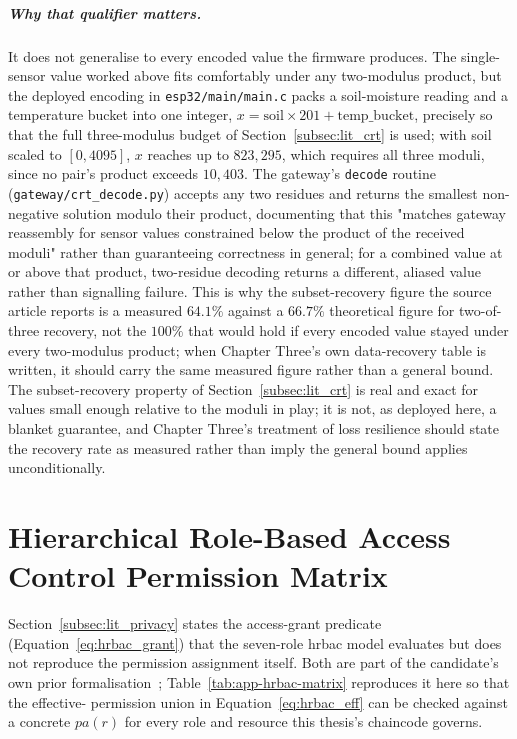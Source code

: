 \documentclass[12pt,a4paper,oneside]{book}
\begin{document}
\paragraph{Why that qualifier matters.} It does not generalise to every
encoded value the firmware produces. The single-sensor value worked above
fits comfortably under any two-modulus product, but the deployed encoding
in \texttt{esp32/main/main.c} packs a soil-moisture reading and a
temperature bucket into one integer, $x = \mathrm{soil}\times 201 +
\mathrm{temp\_bucket}$, precisely so that the full three-modulus budget of
Section~\ref{subsec:lit_crt} is used; with soil scaled to
$[0,4095]$, $x$ reaches up to $823{,}295$, which requires all three
moduli, since no pair's product exceeds $10{,}403$. The gateway's
\texttt{decode} routine (\texttt{gateway/crt\_decode.py}) accepts any two
residues and returns the smallest non-negative solution modulo their
product, documenting that this "matches gateway reassembly for sensor
values constrained below the product of the received moduli" rather than
guaranteeing correctness in general; for a combined value at or above
that product, two-residue decoding returns a different, aliased value
rather than signalling failure. This is why the subset-recovery figure
the source article reports is a measured $64.1\%$ against a $66.7\%$
theoretical figure for two-of-three recovery, not the $100\%$ that would
hold if every encoded value stayed under every two-modulus product; when
Chapter Three's own data-recovery table is written, it should carry the
same measured figure rather than a general bound. The
subset-recovery property of Section~\ref{subsec:lit_crt} is real and
exact for values small enough relative to the moduli in play; it is not,
as deployed here, a blanket guarantee, and Chapter Three's treatment of
loss resilience should state the recovery rate as measured rather than
imply the general bound applies unconditionally.

\chapter{Hierarchical Role-Based Access Control Permission Matrix}
\label{app:hrbac_matrix}

Section~\ref{subsec:lit_privacy} states the access-grant predicate
(Equation~\ref{eq:hrbac_grant}) that the seven-role \gls{hrbac} model
evaluates but does not reproduce the permission assignment itself. Both are
part of the candidate's own prior formalisation~\cite{beloasone2025hrbac};
Table~\ref{tab:app-hrbac-matrix} reproduces it here so that the effective-
permission union in Equation~\ref{eq:hrbac_eff} can be checked against a
concrete $pa(r)$ for every role and resource this thesis's chaincode
governs.
\end{document}
